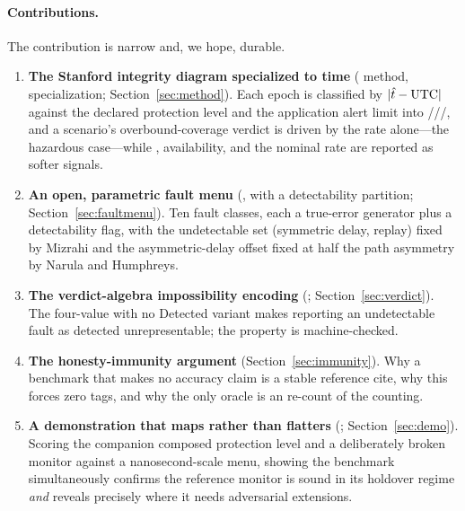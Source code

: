 \paragraph{Contributions.}
The contribution is narrow and, we hope, durable.
\begin{enumerate}
  \item \textbf{The Stanford integrity diagram specialized to time}
  (\Cited{} method, \Proven{} specialization; Section~\ref{sec:method}). Each
  epoch is classified by $|\hat t-\mathrm{UTC}|$ against the declared protection level and
  the application alert limit into \Nominal{}/\Unavail{}/\MI{}/\HMI{}, and a
  scenario's overbound-coverage verdict is driven by the \HMI{} rate alone---the
  hazardous case---while \MI{}, availability, and the nominal rate are reported as
  softer signals.
  \item \textbf{An open, parametric fault menu}
  (\Modelled{}, with a \Cited{} detectability partition;
  Section~\ref{sec:faultmenu}). Ten fault classes, each a true-error generator plus
  a detectability flag, with the undetectable set (symmetric delay, replay) fixed
  by Mizrahi and the asymmetric-delay offset fixed at half the path asymmetry by
  Narula and Humphreys.
  \item \textbf{The verdict-algebra impossibility encoding}
  (\Proven{}; Section~\ref{sec:verdict}). The four-value  with no
  \textsf{Detected} variant makes reporting an undetectable fault as detected
  unrepresentable; the property is machine-checked.
  \item \textbf{The honesty-immunity argument}
  (Section~\ref{sec:immunity}). Why a benchmark that makes no accuracy claim is a
  stable reference cite, why this forces zero \Validated{} tags, and why the
  only oracle is an  re-count of the counting.
  \item \textbf{A demonstration that maps rather than flatters}
  (\Modelled{}; Section~\ref{sec:demo}). Scoring the companion composed protection
  level and a deliberately broken monitor against a nanosecond-scale menu, showing
  the benchmark simultaneously confirms the reference monitor is sound in its
  holdover regime \emph{and} reveals precisely where it needs adversarial
  extensions.
\end{enumerate}

